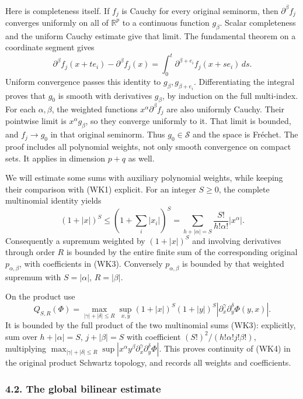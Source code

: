 \documentclass[
  11pt,
]{article}
\begin{document}
Here is completeness itself. If \(f_j\) is Cauchy for every original
seminorm, then \(\partial^\beta f_j\) converges uniformly on all of
\(\mathbb R^p\) to a continuous function \(g_\beta\). Scalar
completeness and the uniform Cauchy estimate give that limit. The
fundamental theorem on a coordinate segment gives \[
 \partial^\beta f_j(x+te_i)-\partial^\beta f_j(x)
     =\int_0^t\partial^{\beta+e_i}f_j(x+se_i)\,ds.
 \tag{WK2}
\] Uniform convergence passes this identity to
\(g_\beta,g_{\beta+e_i}\). Differentiating the integral proves that
\(g_0\) is smooth with derivatives \(g_\beta\), by induction on the full
multi-index. For each \(\alpha,\beta\), the weighted functions
\(x^\alpha\partial^\beta f_j\) are also uniformly Cauchy. Their
pointwise limit is \(x^\alpha g_\beta\), so they converge uniformly to
it. That limit is bounded, and \(f_j\to g_0\) in that original seminorm.
Thus \(g_0\in\mathcal S\) and the space is Fréchet. The proof includes
all polynomial weights, not only smooth convergence on compact sets. It
applies in dimension \(p+q\) as well.

We will estimate some sums with auxiliary polynomial weights, while
keeping their comparison with (WK1) explicit. For an integer \(S\geq0\),
the complete multinomial identity yields \[
 (1+|x|)^S\leq(1+\textstyle\sum_i|x_i|)^S
   =\sum_{h+|\alpha|=S}\frac{S!}{h!\alpha!}|x^\alpha|.
 \tag{WK3}
\] Consequently a supremum weighted by \((1+|x|)^S\) and involving
derivatives through order \(R\) is bounded by the entire finite sum of
the corresponding original \(p_{\alpha,\beta}\), with coefficients in
(WK3). Conversely \(p_{\alpha,\beta}\) is bounded by that weighted
supremum with \(S=|\alpha|\), \(R=|\beta|\).

On the product use \[
 Q_{S,R}(\Phi)=
 \max_{|\gamma|+|\delta|\leq R}
 \sup_{x,y}(1+|x|)^S(1+|y|)^S
          |\partial_x^\gamma\partial_y^\delta\Phi(y,x)|.
 \tag{WK4}
\] It is bounded by the full product of the two multinomial sums (WK3):
explicitly, sum over \(h+|\alpha|=S\), \(j+|\beta|=S\) with coefficient
\( (S!)^2/(h!\alpha!j!\beta!)\), multiplying
\(\max_{|\gamma|+|\delta|\leq R}\sup|x^\alpha y^\beta\partial_x^\gamma\partial_y^\delta\Phi|\).
This proves continuity of (WK4) in the original product Schwartz
topology, and records all weights and coefficients.

\subsubsection{4.2. The global bilinear
estimate}\label{the-global-bilinear-estimate}
\end{document}
